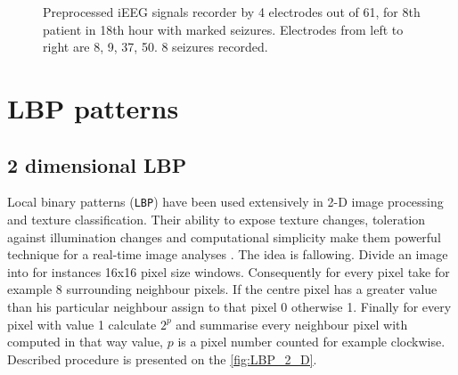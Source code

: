 \begin{figure}[H]
	\begin{center}
	\end{center}
	\caption{Preprocessed iEEG signals recorder by 4 electrodes out of 61, for 8th patient in 18th hour with marked seizures. Electrodes from left to right are 8, 9, 37, 50. 8 seizures recorded.}

	\label{fig:iEEG_18_08_8_9_37_50}
\end{figure}

\section{LBP patterns}
\subsection{2 dimensional LBP}
Local binary patterns (\verb|LBP|) have been used extensively in 2-D image processing and texture classification. Their ability to expose texture changes, toleration against illumination changes and computational simplicity make them powerful technique for a real-time image analyses \cite{lbp_facial}. The idea is fallowing. Divide an image into for instances 16x16 pixel size windows. Consequently for every pixel take for example 8 surrounding neighbour pixels. If the centre pixel has a greater value than his particular neighbour assign to that pixel 0 otherwise 1. Finally for every pixel with value 1 calculate $2^p$ and summarise every neighbour pixel with computed in that way value, $p$ is a pixel number counted for example clockwise. Described procedure is presented on the \figurename{} \ref{fig:LBP_2_D}.

